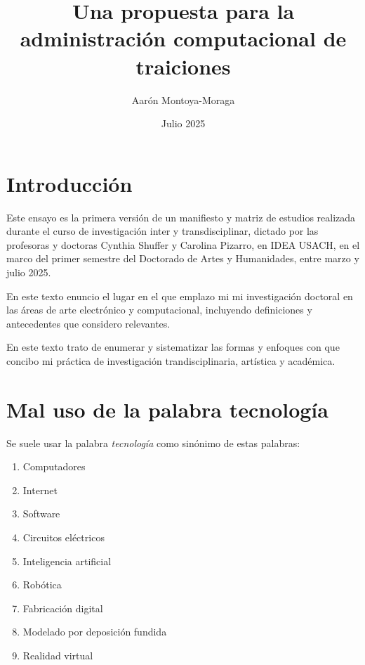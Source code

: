 \documentclass{article}
\title{Una propuesta para la administración computacional de traiciones}
\author{Aarón Montoya-Moraga}
\date{Julio 2025}
\begin{document}
\maketitle

\renewcommand*\contentsname{Tabla de contenidos}

\tableofcontents

\clearpage


\section{Introducción}

Este ensayo es la primera versión de un manifiesto y matriz de estudios realizada durante el curso de investigación inter y transdisciplinar, dictado por las profesoras y doctoras Cynthia Shuffer y Carolina Pizarro, en IDEA USACH, en el marco del primer semestre del Doctorado de Artes y Humanidades, entre marzo y julio 2025.

En este texto enuncio el lugar en el que emplazo mi mi investigación doctoral en las áreas de arte electrónico y computacional, incluyendo definiciones y antecedentes que considero relevantes.

En este texto trato de enumerar y sistematizar las formas y enfoques con que concibo mi práctica de investigación trandisciplinaria, artística y académica.

\clearpage

\section{Mal uso de la palabra tecnología}

Se suele usar la palabra \textit{tecnología} como sinónimo de estas palabras:

\begin{enumerate}
    \item Computadores
    \item Internet
    \item Software
    \item Circuitos eléctricos
    \item Inteligencia artificial
    \item Robótica
    \item Fabricación digital
    \item Modelado por deposición fundida
    \item Realidad virtual
\end{enumerate}
\end{document}
